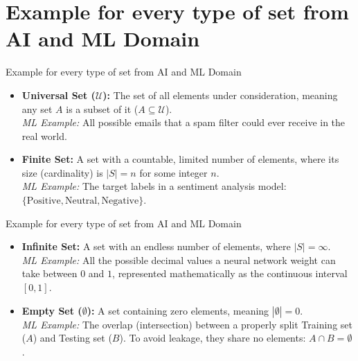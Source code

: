 \documentclass{beamer}
\begin{document}
\section{Example for every type of set from AI and ML Domain}
\begin{frame}{Example for every type of set from AI and ML Domain }
    \begin{itemize}
        \item \textbf{Universal Set ($\mathcal{U}$):} The set of all elements under consideration, meaning any set $A$ is a subset of it ($A \subseteq \mathcal{U}$). 
        \\ \textit{ML Example:} All possible emails that a spam filter could ever receive in the real world.
        
        \vspace{0.5cm}
        \item \textbf{Finite Set:} A set with a countable, limited number of elements, where its size (cardinality) is $|S| = n$ for some integer $n$. 
        \\ \textit{ML Example:} The target labels in a sentiment analysis model: $\{\text{Positive}, \text{Neutral}, \text{Negative}\}$.
    \end{itemize}
\end{frame}

\begin{frame}{Example for every type of set from AI and ML Domain }
    \begin{itemize}
        \item \textbf{Infinite Set:} A set with an endless number of elements, where $|S| = \infty$. 
        \\ \textit{ML Example:} All the possible decimal values a neural network weight can take between $0$ and $1$, represented mathematically as the continuous interval $[0, 1]$.
        
        \vspace{0.5cm}
        \item \textbf{Empty Set ($\emptyset$):} A set containing zero elements, meaning $|\emptyset| = 0$. 
        \\ \textit{ML Example:} The overlap (intersection) between a properly split Training set ($A$) and Testing set ($B$). To avoid leakage, they share no elements: $A \cap B = \emptyset$.
    \end{itemize}
\end{frame}
\end{document}
